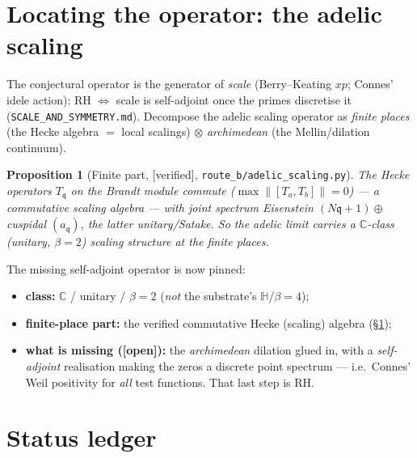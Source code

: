 \documentclass[11pt,a4paper]{article}
\newtheorem{proposition}[theorem]{Proposition}
\theoremstyle{definition}
\newcommand{\C}{\mathbb{C}}
\newcommand{\TAGver}{{\small\textsf{[\textcolor{blue!60!black}{verified}]}}}
\newcommand{\TAGopen}{{\small\textsf{[\textcolor{red!70!black}{open}]}}}
\begin{document}
\section{Locating the operator: the adelic scaling}\label{sec:locate}

The conjectural operator is the generator of \emph{scale} (Berry--Keating
$xp$; Connes' idele action): RH $\Leftrightarrow$ scale is self-adjoint once
the primes discretise it (\texttt{SCALE\_AND\_SYMMETRY.md}). Decompose the
adelic scaling operator as \emph{finite places} (the Hecke algebra $=$ local
scalings) $\otimes$ \emph{archimedean} (the Mellin/dilation continuum).

\begin{proposition}[Finite part, \TAGver, \texttt{route\_b/adelic\_scaling.py}]
The Hecke operators $T_\mathfrak{q}$ on the Brandt module \emph{commute}
($\max\|[T_a,T_b]\|=0$) --- a commutative scaling algebra --- with joint
spectrum Eisenstein $(N\mathfrak{q}+1)\oplus$ cuspidal $(a_\mathfrak{q})$,
the latter unitary/Satake. So the adelic limit carries a $\C$-class
(unitary, $\beta=2$) scaling structure at the finite places.
\end{proposition}

\begin{tcolorbox}[colback=blue!2,colframe=blue!50!black,arc=2mm,
  title={\textbf{The operator, specified as far as honestly possible}},
  fonttitle=\bfseries,breakable]
The missing self-adjoint operator is now pinned:
\begin{itemize}
\item \textbf{class:} $\C$ / unitary / $\beta=2$ (\emph{not} the substrate's
      $\mathbb{H}$/$\beta=4$);
\item \textbf{finite-place part:} the verified commutative Hecke (scaling)
      algebra (\S\ref{sec:locate});
\item \textbf{what is missing (\TAGopen):} the \emph{archimedean} dilation
      glued in, with a \emph{self-adjoint} realisation making the zeros a
      discrete point spectrum --- i.e.\ Connes' Weil positivity for
      \emph{all} test functions. That last step is RH.
\end{itemize}
\end{tcolorbox}

\section{Status ledger}
\end{document}
